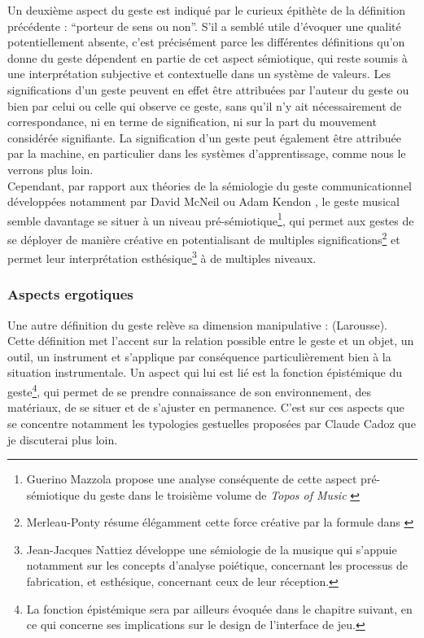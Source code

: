 \noindent Un deuxième aspect du geste est indiqué par le curieux épithète de la définition précédente : ``porteur de sens ou non''. S'il a semblé utile d'évoquer une qualité potentiellement absente, c'est précisément parce les différentes définitions qu'on donne du geste dépendent en partie de cet aspect sémiotique, qui reste soumis à une interprétation subjective et contextuelle dans un système de valeurs. Les significations d'un geste peuvent en effet être attribuées par l'auteur du geste ou bien par celui ou celle qui observe ce geste, sans qu'il n'y ait nécessairement de correspondance, ni en terme de signification, ni sur la part du mouvement considérée signifiante. La signification d'un geste peut également être attribuée par la machine, en particulier dans les systèmes d'apprentissage, comme nous le verrons plus loin.\\
\indent Cependant, par rapport aux théories de la sémiologie du geste communicationnel développées notamment par David McNeil \cite{mcneill_gesture_2005} ou Adam Kendon \cite{kendon_gesture:_2004}, le geste musical semble davantage se situer à un niveau pré-sémiotique\footnote{Guerino Mazzola propose une analyse conséquente de cette aspect pré-sémiotique du geste dans le troisième volume de \textit{Topos of Music} \cite{mazzola_topos_2018}}, qui permet aux gestes de se déployer de manière créative en potentialisant de multiples significations\footnote{Merleau-Ponty résume élégamment cette force créative par la formule  dans \cite{merleau-ponty_phenomenologie_1976}} et permet leur interprétation esthésique\footnote{Jean-Jacques Nattiez développe une sémiologie de la musique qui s'appuie notamment sur les concepts d'analyse poiétique, concernant les processus de fabrication, et esthésique, concernant ceux de leur réception.} à de multiples niveaux.

\subsubsection{Aspects ergotiques}

\noindent Une autre définition du geste relève sa dimension manipulative :  (Larousse). Cette définition met l'accent sur la relation possible entre le geste et un objet, un outil, un instrument et s'applique par conséquence particulièrement bien à la situation instrumentale. Un aspect qui lui est lié est la fonction épistémique du geste\footnote{La fonction épistémique sera par ailleurs évoquée dans le chapitre suivant, en ce qui concerne ses implications sur le design de l'interface de jeu.}, qui permet de se prendre connaissance de son environnement, des matériaux, de se situer et de s'ajuster en permanence. C'est sur ces aspects que se concentre notamment les typologies gestuelles proposées par Claude Cadoz que je discuterai plus loin.\\

